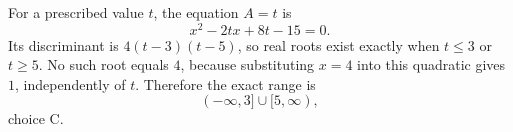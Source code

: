 For a prescribed value $t$, the equation $A=t$ is
\[
x^2-2tx+8t-15=0.
\]
Its discriminant is $4(t-3)(t-5)$, so real roots exist exactly when $t\le3$ or $t\ge5$. No such root equals $4$, because substituting $x=4$ into this quadratic gives $1$, independently of $t$. Therefore the exact range is
\[
\boxed{(-\infty,3]\cup[5,\infty)},
\]
choice $\boxed{\text{C}}$.
